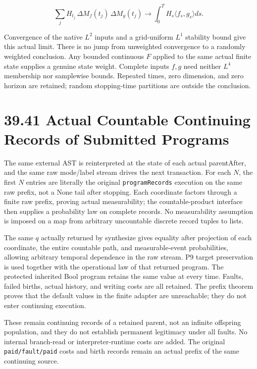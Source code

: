 \documentclass[
  english,
  11pt,
  oneside]{book}
\begin{document}
\[\sum_j H_{t_j}\,\Delta M_f(t_j)\,\Delta M_g(t_j)
\longrightarrow\int_0^T H_s\langle f_s,g_s\rangle ds.\]

Convergence of the native \(L^2\) inputs and a grid-uniform \(L^1\) stability bound give this actual limit. There is no jump from unweighted convergence to a randomly weighted conclusion. Any bounded continuous \(F\) applied to the same actual finite state supplies a genuine state weight. Complete inputs \(f,g\) need neither \(L^4\) membership nor samplewise bounds. Repeated times, zero dimension, and zero horizon are retained; random stopping-time partitions are outside the conclusion.

\section{39.41 Actual Countable Continuing Records of Submitted Programs}\label{actual-countable-continuing-records-of-submitted-programs}

The same external AST is reinterpreted at the state of each actual parentAfter, and the same raw mode/label stream drives the next transaction. For each \(N\), the first \(N\) entries are literally the original \nolinkurl{programRecords} execution on the same raw prefix, not a None tail after stopping. Each coordinate factors through a finite raw prefix, proving actual measurability; the countable-product interface then supplies a probability law on complete records. No measurability assumption is imposed on a map from arbitrary uncountable discrete record tuples to lists.

The same \(q\) actually returned by synthesize gives equality after projection of each coordinate, the entire countable path, and measurable-event probabilities, allowing arbitrary temporal dependence in the raw stream. P9 target preservation is used together with the operational law of that returned program. The protected inherited Bool program retains the same value at every time. Faults, failed births, actual history, and writing costs are all retained. The prefix theorem proves that the default values in the finite adapter are unreachable; they do not enter continuing execution.

These remain continuing records of a retained parent, not an infinite offspring population, and they do not establish permanent legitimacy under all faults. No internal branch-read or interpreter-runtime costs are added. The original \nolinkurl{paid/fault/paid} costs and birth records remain an actual prefix of the same continuing source.
\end{document}

